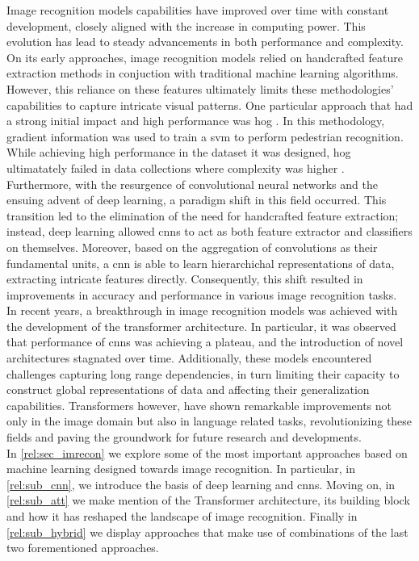 \noindent Image recognition models capabilities have improved over time with constant development, 
closely aligned with the increase in computing power. This evolution has lead to steady 
advancements in both performance and complexity. On its early approaches, image recognition models 
relied on handcrafted feature extraction methods  in conjuction with traditional machine learning 
algorithms. However, this reliance on these features ultimately limits these methodologies' 
capabilities to capture intricate visual patterns.
One particular approach that had a strong initial impact and high performance was \gls{hog} 
\autocite{dalal2005histograms}. In this methodology, gradient information was used to train a 
\gls{svm} to perform pedestrian recognition. While achieving high performance in the dataset it was 
designed, \gls{hog} ultimatately failed in data collections where complexity was higher 
\autocite{5975165}.\\
Furthermore, with the resurgence of convolutional neural networks and the ensuing advent of 
deep learning, a paradigm shift in this field occurred. This transition led to the elimination of 
the need for handcrafted feature extraction; instead, deep learning allowed \glspl{cnn} to act 
as both feature extractor and classifiers on themselves. Moreover, based on the aggregation of 
convolutions as their fundamental units, a \gls{cnn} is able to learn hierarchichal 
representations of data, extracting intricate features directly. 
Consequently, this shift resulted in improvements in accuracy and performance in various image 
recognition tasks. \\

In recent years, a breakthrough in image recognition models was achieved with the development of 
the transformer architecture. In particular, it was observed that performance of \glspl{cnn} was 
achieving a plateau, and the introduction of novel architectures stagnated over time. Additionally, 
these models encountered challenges capturing long range dependencies, in turn  limiting their 
capacity to construct global representations of data and affecting their generalization capabilities. 
Transformers however, have shown remarkable improvements not only in the image 
domain but also in language related tasks, revolutionizing these fields and paving the groundwork 
for future research and developments.\\

\noindent In \autoref{rel:sec_imrecon} we explore some of the most important approaches based 
on machine learning designed towards image recognition. In particular, in \autoref{rel:sub_cnn}, we 
introduce the basis of deep learning and \glspl{cnn}. Moving on, in \autoref{rel:sub_att} we make 
mention of the Transformer architecture, its building block and how it has reshaped the landscape 
of image recognition. Finally in \autoref{rel:sub_hybrid} we display approaches that make use of 
combinations of the last two forementioned approaches.\\


